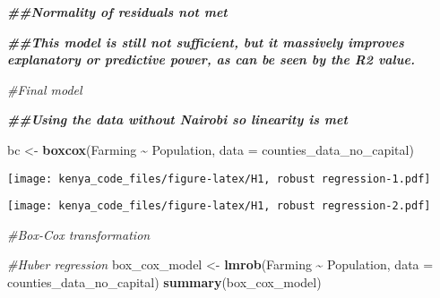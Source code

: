 \documentclass[
]{article}
\newenvironment{Shaded}{\begin{snugshade}}{\end{snugshade}}
\newcommand{\AttributeTok}[1]{\textcolor[rgb]{0.13,0.29,0.53}{#1}}
\newcommand{\CommentTok}[1]{\textcolor[rgb]{0.56,0.35,0.01}{\textit{#1}}}
\newcommand{\DecValTok}[1]{\textcolor[rgb]{0.00,0.00,0.81}{#1}}
\newcommand{\DocumentationTok}[1]{\textcolor[rgb]{0.56,0.35,0.01}{\textbf{\textit{#1}}}}
\newcommand{\FunctionTok}[1]{\textcolor[rgb]{0.13,0.29,0.53}{\textbf{#1}}}
\newcommand{\NormalTok}[1]{#1}
\newcommand{\OtherTok}[1]{\textcolor[rgb]{0.56,0.35,0.01}{#1}}
\newcommand{\SpecialCharTok}[1]{\textcolor[rgb]{0.81,0.36,0.00}{\textbf{#1}}}
\begin{document}
\begin{Shaded}
\begin{Highlighting}[]
\DocumentationTok{\#\#Normality of residuals not met}

\DocumentationTok{\#\#This model is still not sufficient, but it massively improves explanatory or predictive power, as can be seen by the R2 value.}
\end{Highlighting}
\end{Shaded}

\begin{Shaded}
\begin{Highlighting}[]
\CommentTok{\#Final model}

\DocumentationTok{\#\#Using the data without Nairobi so linearity is met}

\NormalTok{bc }\OtherTok{\textless{}{-}} \FunctionTok{boxcox}\NormalTok{(Farming }\SpecialCharTok{\textasciitilde{}}\NormalTok{ Population, }\AttributeTok{data =}\NormalTok{ counties\_data\_no\_capital)}
\end{Highlighting}
\end{Shaded}

\texttt{[image: kenya\_code\_files/figure-latex/H1, robust regression-1.pdf]}

\begin{Shaded}
\end{Shaded}

\texttt{[image: kenya\_code\_files/figure-latex/H1, robust regression-2.pdf]}

\begin{Shaded}
\begin{Highlighting}[]
\CommentTok{\#Box{-}Cox transformation}



\CommentTok{\#Huber regression}
\NormalTok{box\_cox\_model }\OtherTok{\textless{}{-}} \FunctionTok{lmrob}\NormalTok{(Farming }\SpecialCharTok{\textasciitilde{}}\NormalTok{ Population, }\AttributeTok{data =}\NormalTok{ counties\_data\_no\_capital)}
\FunctionTok{summary}\NormalTok{(box\_cox\_model)}
\end{Highlighting}
\end{Shaded}
\end{document}
